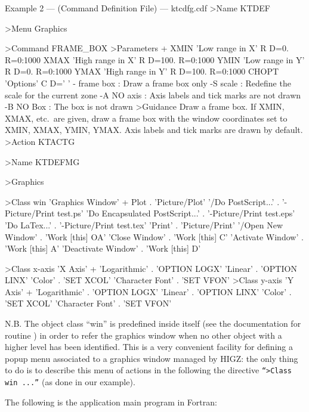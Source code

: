 \begin{XMPt} {Example 2 --- \CDF{} (Command Definition File) ---
ktcdfg.cdf}
>Name KTDEF

>Menu Graphics

>Command FRAME_BOX
>Parameters
+
XMIN  'Low range in X'  R D=0. R=0:1000
XMAX  'High range in X' R D=100. R=0:1000
YMIN  'Low range in Y'  R D=0. R=0:1000
YMAX  'High range in Y' R D=100. R=0:1000
CHOPT 'Options'         C D=' '
-  frame box : Draw a frame box only
-S scale : Redefine the scale for the current zone
-A NO axis : Axis labels and tick marks are not drawn
-B NO Box : The box is not drawn
>Guidance
Draw a frame box.
If XMIN, XMAX, etc.\ are given, draw a frame box
with the window coordinates set to XMIN, XMAX, YMIN, YMAX. Axis
labels and tick marks are drawn by default.
>Action KTACTG

>Name KTDEFMG

>Graphics

>Class win 'Graphics Window'
+
 Plot                            . 'Picture/Plot'
'/Do PostScript...'              . '-Picture/Print test.ps'
'Do Encapsulated PostScript...'  . '-Picture/Print test.eps'
'Do LaTex...'                    . '-Picture/Print test.tex'
'Print'                          . 'Picture/Print'
'/Open New Window'               . 'Work [this] OA'
'Close Window'                   . 'Work [this] C'
'Activate Window'                . 'Work [this] A'
'Deactivate Window'              . 'Work [this] D'

>Class x-axis 'X Axis'
+
'Logarithmic'    . 'OPTION LOGX'
'Linear'         . 'OPTION LINX'
'Color'          . 'SET XCOL'
'Character Font' . 'SET VFON'
>Class y-axis 'Y Axis'
+
'Logarithmic'    . 'OPTION LOGX'
'Linear'         . 'OPTION LINX'
'Color'          . 'SET XCOL'
'Character Font' . 'SET VFON'
\end{XMPt}

N.B. The object class ``win'' is predefined inside \HIGZ{} itself (see the
\HIGZ{} documentation for routine \IGOBJ{}) in order to refer the graphics 
window when no other object with a higher level has been identified.
This is a very convenient  facility for defining a popup menu associated
to a graphics window managed by HIGZ: the only thing to do is to describe 
this menu of actions in the \CDF{} following the directive 
{\tt ``>Class win ...''} (as done in our example).

The following is the application main program in Fortran:

